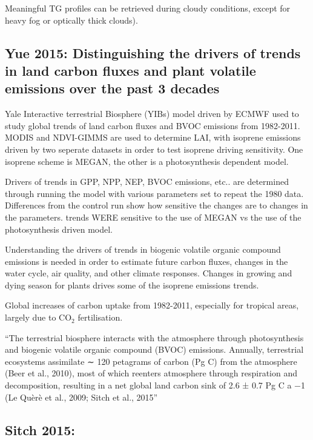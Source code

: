 \documentclass[11pt]{article} %
\begin{document}
    Meaningful TG profiles can be retrieved during cloudy conditions, except for heavy fog or optically thick clouds).
    
  \subsection{Yue 2015: Distinguishing the drivers of trends in land carbon fluxes and plant
volatile emissions over the past 3 decades}
    \citet{Yue2015}
    Yale Interactive terrestrial Biosphere (YIBs) model driven by ECMWF used to study global trends of land carbon fluxes and BVOC emissions from 1982-2011.
    MODIS and NDVI-GIMMS are used to determine LAI, with isoprene emissions driven by two seperate datasets in order to test isoprene driving sensitivity.
    One isoprene scheme is MEGAN, the other is a photosynthesis dependent model.
    
    Drivers of trends in GPP, NPP, NEP, BVOC emissions, etc.. are determined through running the model with various parameters set to repeat the 1980 data.
    Differences from the control run show how sensitive the changes are to changes in the parameters.
    trends WERE sensitive to the use of MEGAN vs the use of the photosynthesis driven model.
    
    Understanding the drivers of trends in biogenic volatile organic compound emissions is needed in order to estimate future carbon fluxes, changes in the water cycle, air quality, and other climate responses.
    Changes in growing and dying season for plants drives some of the isoprene emissions trends.
    
    Global increases of carbon uptake from 1982-2011, especially for tropical areas, largely due to CO$_2$ fertilisation.
    
    ``The terrestrial biosphere interacts with the atmosphere through photosynthesis and biogenic volatile organic compound (BVOC) emissions. Annually, terrestrial ecosystems assimilate ∼ 120 petagrams of carbon (Pg C) from the atmosphere (Beer et al., 2010), most of which reenters atmosphere through respiration and decomposition, resulting in a net global land carbon sink of 2.6 ± 0.7 Pg C a −1 (Le Quèrè et al., 2009; Sitch et al., 2015''
    
    
  \subsection{Sitch 2015: }
\end{document}
